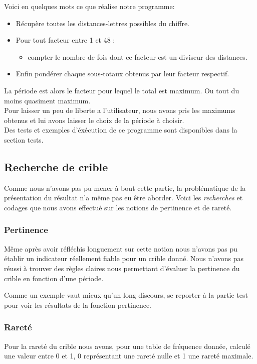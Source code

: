 \documentclass[a4paper, 11pt]{article}
\begin{document}
Voici en quelques mots ce que réalise notre programme:
\begin{itemize}
\item Récupère toutes les distances-lettres possibles du chiffre.
\item Pour tout facteur entre 1 et 48 :
  \begin{itemize}
  \item compter le nombre de fois dont ce facteur est un diviseur des
    distances.
  \end{itemize}
\item Enfin pondérer chaque sous-totaux obtenus par leur facteur
  respectif.
\end{itemize}

La période est alors le facteur pour lequel le total est maximum. Ou
tout du moins quasiment maximum.\\
Pour laisser un peu de liberte a l'utilisateur, nous avons pris les
maximums obtenus et lui avons laisser le choix de la période à
choisir.\\

Des tests et exemples d'éxécution de ce programme sont disponibles
dans la section tests.


\subsection{Recherche de crible}

Comme nous n'avons pas pu mener à bout cette partie, la problématique
de la présentation du résultat n'a même pas eu être aborder.
Voici les \textit{recherches} et codages que nous avons effectué sur
les notions de pertinence et de rareté.

\subsubsection{Pertinence}
Même après avoir réfléchis longuement sur cette notion nous n'avons
pas pu établir un indicateur réellement fiable pour un crible donné.
Nous n'avons pas réussi à trouver des règles claires nous permettant
d'évaluer la pertinence du crible en fonction d'une période.

Comme un exemple vaut mieux qu'un long discours, se reporter à la
partie test pour voir les résultats de la fonction pertinence.


\subsubsection{Rareté}
Pour la rareté du crible nous avons, pour une table de
fréquence donnée, calculé une valeur entre 0 et 1, 0 représentant une
rareté nulle et 1 une rareté maximale.
\end{document}

